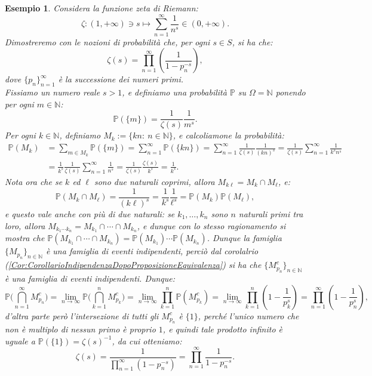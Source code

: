 \documentclass[11pt]{book}
\theoremstyle{Definizione}
\theoremstyle{TeoremaProposizioneLemmaCorollario}
\theoremstyle{OsservazioneNota}
\newtheorem{myes}{Esempio}[section]
\newcommand{\N}{\mathbb{N}}
\renewcommand{\P}{\mathbb{P}}
\begin{document}
\begin{myes}
Considera la \textsl{funzione zeta di Riemann}:
$$
\zeta: (1,+\infty)\ni s \longmapsto \sum_{n = 1}^\infty \frac{1}{n^s}\in (0,+\infty).
$$
Dimostreremo con le nozioni di probabilità che, per ogni $s\in S$, si ha che:
$$
\zeta(s) = \prod_{n = 1}^\infty \left(\frac{1}{1-p_n^{-s}}\right),
$$
dove $\{p_n\}_{n = 1}^\infty$ è la successione dei numeri primi.\\
Fissiamo un numero reale $s > 1$, e definiamo una probabilità $\P$ su $\Omega = \N$ ponendo per ogni $m\in \N$:
$$
\P(\{m\}) = \frac{1}{\zeta(s)}\frac{1}{m^s}.
$$
Per ogni $k\in \N$, definiamo $M_k:= \{kn:\ n\in \N\}$, e calcoliamone la probabilità:
\begin{align*}
\P(M_k) &= \sum_{m\in M_k} \P(\{m\}) = \sum_{n = 1}^\infty \P(\{kn\}) = \sum_{n = 1}^\infty \frac{1}{\zeta(s)}\frac{1}{(kn)^s} = \frac{1}{\zeta(s)}\sum_{n = 1}^\infty \frac{1}{k^sn^s} \\
&= \frac{1}{k^s} \frac{1}{\zeta(s)}\sum_{n = 1}^\infty \frac{1}{n^s} = \frac{1}{\zeta(s)}\frac{\zeta(s)}{k^s} = \frac{1}{k^s}.
\end{align*}
Nota ora che se $k$ ed $\ell$ sono due naturali coprimi, allora $M_{k\ell} = M_k \cap M_\ell$, e:
$$
\P(M_{k}\cap M_\ell) = \frac{1}{(k\ell)^s} = \frac{1}{k^s}\frac{1}{\ell^s} = \P(M_k)\P(M_\ell),
$$
e questo vale anche con più di due naturali: se $k_1,\dots,k_n$ sono $n$ naturali primi tra loro, allora $M_{k_1\cdots k_n} = M_{k_1}\cap \cdots \cap M_{k_n}$, e dunque con lo stesso ragionamento si mostra che $\P(M_{k_1}\cap \cdots \cap M_{k_n}) = \P(M_{k_1})\cdots \P(M_{k_n})$. Dunque la famiglia $\{M_{p_n}\}_{n \in \N}$ è una famiglia di eventi indipendenti, perciò dal corolalrio (\ref{Cor:CorollarioIndipendenzaDopoProposizioneEquivalenza}) si ha che $\{M_{p_n}^c\}_{n\in \N}$ è una famiglia di eventi indipendenti. Dunque:
$$
\P\Bigg(\bigcap_{n = 1}^\infty M_{p_n}^c\Bigg) = \lim_{n \to \infty} \P\Bigg(\bigcap_{k = 1}^nM_{p_k}^c\Bigg) = \lim_{n \to \infty} \prod_{k = 1}^n \P(M_{p_k}^c) = \lim_{n \to \infty} \prod_{k = 1}^n \left(1-\frac{1}{p_k^s}\right) = \prod_{n = 1}^\infty \left(1-\frac{1}{p_n^s}\right),
$$
d'altra parte però l'intersezione di tutti gli $M_{p_n}^c$ è $\{1\}$, perché l'unico numero che non è multiplo di nessun primo è proprio $1$, e quindi tale prodotto infinito è uguale a $\P(\{1\}) = \zeta(s)^{-1}$, da cui otteniamo:
$$
\zeta(s) = \frac{1}{\displaystyle\prod_{n = 1}^\infty \left(1-p_n^{-s}\right)} = \prod_{n = 1}^\infty \frac{1}{1-p_n^{-s}}.
$$
\end{myes}
\end{document}
